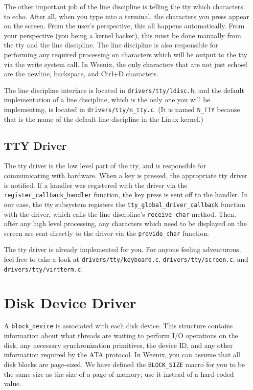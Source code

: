 The other important job of the line discipline is telling the tty which characters to echo. After all, when you type into a terminal, the characters you press appear on the screen. From the user's perspective, this all happens automatically. From your perspective (you being a kernel hacker), this must be done manually from the tty and the line discipline. The line discipline is also responsible for performing any required processing on characters which will be output to the tty via the write system call. In Weenix, the only characters that are not just echoed are the newline, backspace, and Ctrl+D characters.

The line discipline interface is located in \texttt{drivers/tty/ldisc.h}, and the default implementation of a line discipline, which is the only one you will be implementing, is located in \texttt{drivers/tty/n\_tty.c}. (It is named \texttt{N\_TTY} because that is the name of the default line discipline in the Linux kernel.) 

\subsection{TTY Driver}
The tty driver is the low level part of the tty, and is responsible for communicating with hardware. When a key is pressed, the appropriate tty driver is notified. If a handler was registered with the driver via the \texttt{register\_callback\_handler} function, the key press is sent off to the handler. In our case, the tty subsystem registers the \texttt{tty\_global\_driver\_callback} function with the driver, which calls the line discipline's \texttt{receive\_char} method. Then, after any high level processing, any characters which need to be displayed on the screen are sent directly to the driver via the \texttt{provide\_char} function.

The tty driver is already implemented for you. For anyone feeling adventurous, feel free to take a look at \texttt{drivers/tty/keyboard.c}, \texttt{drivers/tty/screen.c}, and \texttt{drivers/tty/virtterm.c}. 

\section{Disk Device Driver}
A \texttt{block\_device} is associated with each disk device. This structure contains information about what threads are waiting to perform I/O operations on the disk, any necessary synchronization primitives, the device ID, and any other information required by the ATA protocol. In Weenix, you can assume that all disk blocks are page-sized. We have defined the \texttt{BLOCK\_SIZE} macro for you to be the same size as the size of a page of memory; use it instead of a hard-coded value. 


